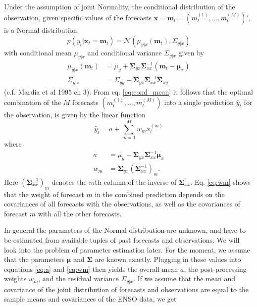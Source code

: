 \documentclass[12pt]{article}
\renewcommand{\vec}[1]{\bm{#1}}
\newcommand{\mat}[1]{\bm{#1}}
\begin{document}
Under the assumption of joint Normality, the conditional distribution of the observation, given specific values of the forecasts $\vec{x} = \vec{m}_t = (m_t^{(1)}, \dots, m_t^{(M)})'$, is a Normal distribution
%
\begin{equation}
p(y_t | \vec{x}_t = \vec{m}_t) = \mathcal{N}(\mu_{y|x}(\vec{m}_t), \Sigma_{y|x})
\label{eq:regrlemma}
\end{equation}
%
with conditional mean $\mu_{y|x}$ and conditional variance $\Sigma_{y|x}$ given by
%
\begin{align}
\mu_{y|x}(\vec{m}_t) & = \mu_{y} + \mat{\Sigma}_{yx} \mat{\Sigma}_{xx}^{-1} (\vec{m}_t - \vec{\vec{\mu}}_x)\label{eq:cond_mean}\\
\Sigma_{y|x} & = \Sigma_{yy} - \mat{\Sigma}_{yx} \mat{\Sigma}_{xx}^{-1} \mat{\Sigma}_{xy}
\end{align}
%
(c.f. Mardia et al 1995 ch 3). 
From eq. \ref{eq:cond_mean} it follows that the optimal combination of the $M$ forecasts $(m_t^{(1)},\dots,m_t^{(M)})$ into a single prediction $\hat{y}_t$ for the observation, is given by the linear function
\begin{equation}
\hat{y}_t = a + \sum_{m=1}^M w_m x^{(m)}_t
\label{eq:y_hat}
\end{equation}
%
where
%
\begin{align}
a & = \mu_y - \mat{\Sigma}_{yx} \mat{\Sigma}_{xx}^{-1} \vec{\mu}_x\label{eq:a}\\
w_m & = \mat{\Sigma}_{yx}(\mat{\Sigma}_{xx}^{-1})_{m}\label{eq:wm}.
\end{align}
%
Here $(\mat{\Sigma}_{xx}^{-1})_m$ denotes the $m$th column of the inverse of $\mat{\Sigma}_{xx}$.
Eq. \ref{eq:wm} shows that the weight of forecast $m$ in the combined prediction depends on the covariances of all forecasts with the observations, as well as the covariances of forecast $m$ with all the other forecasts.



In general the parameters of the Normal distribution are unknown, and have to be estimated from available tuples of past forecasts and observations.
We will look into the problem of parameter estimation later.
For the moment, we assume that the parameters $\vec{\mu}$ and $\mat{\Sigma}$ are known exactly.
Plugging in these values into equations \ref{eq:a} and \ref{eq:wm} then yields the overall mean $a$, the post-processing weights $w_m$, and the residual variance $\Sigma_{y|x}$. 
If we assume that the mean and covariance of the joint distribution of forecasts and observations are equal to the sample means and covariances of the ENSO data, we get
\end{document}

